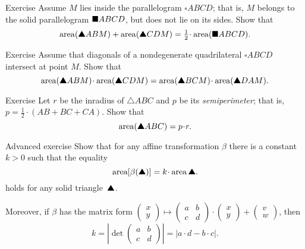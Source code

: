 \begin{thm}{Exercise}\label{ex:half-parallelogram}
Assume $M$ lies inside the parallelogram $\square ABCD$;
that is, $M$ belongs to the solid parallelogram $\blacksquare ABCD$, but does not lie on its sides.
Show that
\[\area(\solidtriangle ABM)+\area(\solidtriangle CDM)
=\tfrac12\cdot \area(\solidsquare ABCD).\]
\end{thm}


\begin{thm}{Exercise}\label{ex:area-diag}
Assume that diagonals 
of a nondegenerate quadrilateral $\square ABCD$ 
intersect at point $M$.
Show that 
\[\area(\solidtriangle ABM)\cdot\area(\solidtriangle CDM)
=
\area(\solidtriangle BCM)\cdot\area(\solidtriangle DAM).\]
 
\end{thm}

\begin{thm}{Exercise}\label{ex:area-inradius}
Let $r$ be the inradius of $\triangle ABC$
and $p$ be its {}\emph{semiperimeter}; 
that is, $p=\tfrac12\cdot(AB+BC+CA)$.
Show that
\[\area(\solidtriangle ABC)=p\cdot r.\]

\end{thm}

\begin{thm}{Advanced exercise}\label{ex:area-affine}
Show that for any affine transformation $\beta$ there is a constant $k>0$
such that the equality 
\[\area[\beta(\solidtriangle)]=k\cdot\area\solidtriangle.\]
holds for any solid triangle~$\solidtriangle$.

Moreover, if $\beta$ has the matrix form $\left(\begin{smallmatrix}
x\\ y
\end{smallmatrix} \right)
  \mapsto
  \left(\begin{smallmatrix}
a&b\\ c&d
\end{smallmatrix} \right)
  \cdot
  \left(\begin{smallmatrix}
x\\ y
\end{smallmatrix} \right)
  +
\left(\begin{smallmatrix}
v\\ w
\end{smallmatrix} \right)$,
then 
\[k=|\det\left(\begin{smallmatrix}
a&b\\ c&d
\end{smallmatrix} \right)|=|a\cdot d-b\cdot c|.\]

\end{thm}





